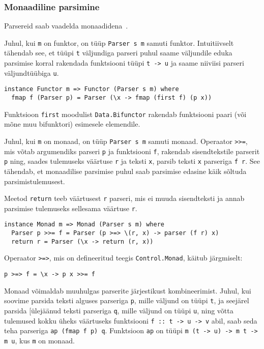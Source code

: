 \documentclass[12pt]{article}
\begin{document}
      \subsubsection{Monaadiline parsimine}
        Parsereid saab vaadelda monaadidena~\cite{Mon}.

        Juhul, kui \verb!m! on funktor, on tüüp \verb!Parser s m! samuti funktor. Intuitiivselt tähendab see, et tüüpi \verb!t! väljundiga parseri puhul saame väljundile eduka parsimise korral rakendada funktsiooni tüüpi \verb!t -> u! ja saame niiviisi parseri väljundtüübiga \verb!u!.

        \begin{verbatim}instance Functor m => Functor (Parser s m) where
  fmap f (Parser p) = Parser (\x -> fmap (first f) (p x))\end{verbatim}

        Funktsioon \verb!first! moodulist \verb!Data.Bifunctor! rakendab funktsiooni paari (või mõne muu bifunktori) esimesele elemendile.

        Juhul, kui \verb!m! on monaad, on tüüp \verb!Parser s m! samuti monaad. Operaator \verb!>>=!, mis võtab argumendiks parseri \verb!p! ja funktsiooni \verb!f!, rakendab sisendtekstile parserit \verb!p! ning, saades tulemuseks väärtuse \verb!r! ja teksti \verb!x!, parsib teksti \verb!x! parseriga \verb!f r!. See tähendab, et monaadilise parsimise puhul saab parsimise edasine käik sõltuda parsimistulemusest.

        Meetod \verb!return! teeb väärtusest \verb!r! parseri, mis ei muuda sisendteksti ja annab parsimise tulemuseks sellesama väärtuse \verb!r!.

        \begin{verbatim}instance Monad m => Monad (Parser s m) where
  Parser p >>= f = Parser (p >=> \(r, x) -> parser (f r) x)
  return r = Parser (\x -> return (r, x))\end{verbatim}

        Operaator \verb!>=>!, mis on defineeritud teegis \verb!Control.Monad!, käitub järgmiselt:

        \begin{verbatim}p >=> f = \x -> p x >>= f\end{verbatim}

        Monaad võimaldab muuhulgas parserite järjestikust kombineerimist. Juhul, kui soovime parsida teksti alguses parseriga \verb!p!, mille väljund on tüüpi \verb!t!, ja seejärel parsida [ülejäänud teksti parseriga \verb!q!, mille väljund on tüüpi \verb!u!, ning võtta tulemused kokku üheks väärtuseks funktsiooni \verb!f :: t -> u -> v! abil, saab seda teha parseriga \verb!ap (fmap f p) q!. Funktsioon \verb!ap! on tüüpi \verb!m (t -> u) -> m t -> m u!, kus \verb!m! on monaad. 
\end{document}
